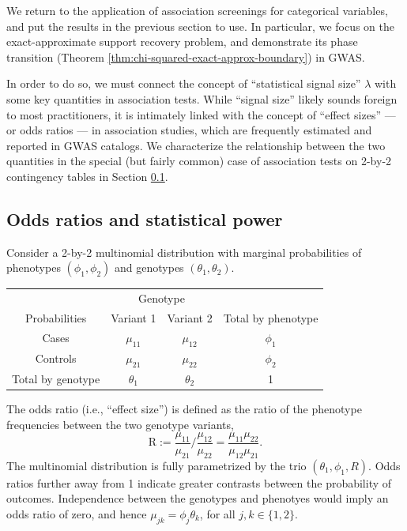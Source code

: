 

We return to the application of association screenings for categorical variables, and put the results in the previous section to use.
In particular, we focus on the exact-approximate support recovery problem, and demonstrate its phase transition (Theorem \ref{thm:chi-squared-exact-approx-boundary}) in GWAS.

In order to do so, we must connect the concept of ``statistical signal size'' $\lambda$ with some key quantities in association tests.
While ``signal size'' likely sounds foreign to most practitioners, it is intimately linked with the concept of ``effect sizes'' --- or odds ratios --- in association studies, which are frequently estimated and reported in GWAS catalogs.
We characterize the relationship between the two quantities in the special (but fairly common) case of association tests on 2-by-2 contingency tables in Section \ref{subsec:odds-and-power}.


\subsection{Odds ratios and statistical power}
\label{subsec:odds-and-power}


Consider a 2-by-2 multinomial distribution with marginal probabilities of phenotypes $(\phi_1, \phi_2)$ and genotypes $(\theta_1, \theta_2)$.
\begin{center}
    \begin{tabular}{cccc}
    \hline
    & \multicolumn{2}{c}{Genotype} \\
    \cline{2-3}
    Probabilities & Variant 1 & Variant 2 & Total by phenotype \\
    \hline
    Cases & $\mu_{11}$ & $\mu_{12}$ & $\phi_1$ \\
    Controls & $\mu_{21}$ & $\mu_{22}$ & $\phi_2$ \\
    Total by genotype & $\theta_1$ & $\theta_2$ & 1 \\
    \hline
    \end{tabular}
\end{center}
The odds ratio (i.e., ``effect size'') is defined as the ratio of the phenotype frequencies between the two genotype variants,
\begin{equation} \label{eq:odds-ratio}
    \text{R} := \frac{\mu_{11}}{\mu_{21}}\Big/\frac{\mu_{12}}{\mu_{22}}
    = \frac{\mu_{11}\mu_{22}}{\mu_{12}\mu_{21}}.
\end{equation}
The multinomial distribution is fully parametrized by the trio $(\theta_1, \phi_1, R)$.
Odds ratios further away from 1 indicate greater contrasts between the probability of outcomes.
Independence between the genotypes and phenotyes would imply an odds ratio of zero, and hence $\mu_{jk} = \phi_j\theta_k$, for all $j,k \in\{1,2\}$.


